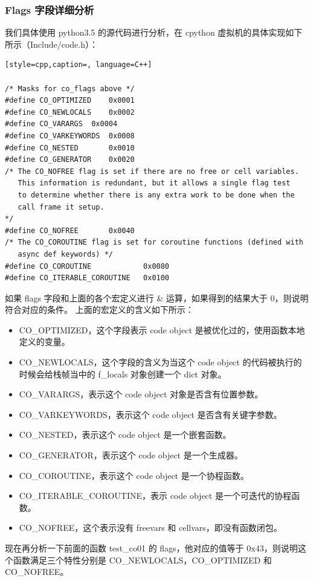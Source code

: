 \subsubsection{Flags 字段详细分析}
我们具体使用 python3.5 的源代码进行分析，在 cpython 虚拟机的具体实现如下所示（Include/code.h）：
\begin{lstlisting}[style=cpp,caption=, language=C++]

/* Masks for co_flags above */
#define CO_OPTIMIZED	0x0001
#define CO_NEWLOCALS	0x0002
#define CO_VARARGS	0x0004
#define CO_VARKEYWORDS	0x0008
#define CO_NESTED       0x0010
#define CO_GENERATOR    0x0020
/* The CO_NOFREE flag is set if there are no free or cell variables.
   This information is redundant, but it allows a single flag test
   to determine whether there is any extra work to be done when the
   call frame it setup.
*/
#define CO_NOFREE       0x0040
/* The CO_COROUTINE flag is set for coroutine functions (defined with
   async def keywords) */
#define CO_COROUTINE            0x0080
#define CO_ITERABLE_COROUTINE   0x0100
\end{lstlisting}
如果 flags 字段和上面的各个宏定义进行 \& 运算，如果得到的结果大于 0，则说明符合对应的条件。
上面的宏定义的含义如下所示：
\begin{itemize}
\item CO\_OPTIMIZED，这个字段表示 code object 是被优化过的，使用函数本地定义的变量。 
\item CO\_NEWLOCALS，这个字段的含义为当这个 code object 的代码被执行的时候会给栈帧当中的 f\_locals 对象创建一个 dict 对象。 
\item CO\_VARARGS，表示这个 code object 对象是否含有位置参数。 
\item CO\_VARKEYWORDS，表示这个 code object 是否含有关键字参数。 
\item CO\_NESTED，表示这个 code object 是一个嵌套函数。 
\item CO\_GENERATOR，表示这个 code object 是一个生成器。 
\item CO\_COROUTINE，表示这个 code object 是一个协程函数。 
\item CO\_ITERABLE\_COROUTINE，表示 code object 是一个可迭代的协程函数。 
\item CO\_NOFREE，这个表示没有 freevars 和 cellvars，即没有函数闭包。 
\end{itemize}
现在再分析一下前面的函数 test\_co01 的 flags，他对应的值等于 0x43，则说明这个函数满足三个特性分别是 CO\_NEWLOCALS，CO\_OPTIMIZED 和 CO\_NOFREE。
